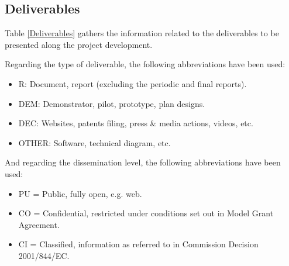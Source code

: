\pagebreak



\subsection{Deliverables}
\label{deliverables}
Table \ref{Deliverables} gathers the information related to the deliverables to be presented along the project development.

Regarding the type of deliverable, the following abbreviations have been used:
\begin{itemize}
	\item R: Document, report (excluding the periodic and final reports).
	\item DEM: Demonstrator, pilot, prototype, plan designs.
	\item DEC: Websites, patents filing, press \& media actions, videos, etc.
	\item OTHER: Software, technical diagram, etc.
\end{itemize}

And regarding the dissemination level, the following abbreviations have been used:
\begin{itemize}
	\item PU = Public, fully open, e.g. web.
	\item CO = Confidential, restricted under conditions set out in Model Grant Agreement.
	\item CI = Classified, information as referred to in Commission Decision 2001/844/EC.
\end{itemize}

